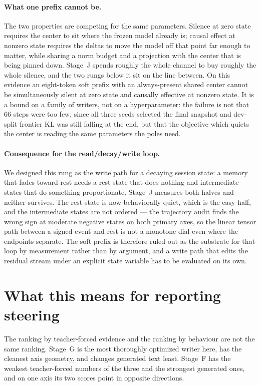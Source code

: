 \documentclass[10pt]{article}
\begin{document}
\paragraph{What one prefix cannot be.} The two properties are competing for the
same parameters. Silence at zero state requires the center to sit where the
frozen model already is; causal effect at nonzero state requires the deltas to
move the model off that point far enough to matter, while sharing a norm budget
and a projection with the center that is being pinned down. Stage~J spends
roughly the whole channel to buy roughly the whole silence, and the two rungs
below it sit on the line between. On this evidence an eight-token soft prefix
with an always-present shared center cannot be simultaneously silent at zero
state and causally effective at nonzero state. It is a bound on a family of
writers, not on a hyperparameter: the failure is not that 66 steps were too few,
since all three seeds selected the final snapshot and dev-split frontier KL was
still falling at the end, but that the objective which quiets the center is
reading the same parameters the poles need.

\paragraph{Consequence for the read/decay/write loop.} We designed this rung as
the write path for a decaying session state: a memory that fades toward rest
needs a rest state that does nothing and intermediate states that do something
proportionate. Stage~J measures both halves and neither survives. The rest state
is now behaviorally quiet, which is the easy half, and the intermediate states
are not ordered --- the trajectory audit finds the wrong sign at moderate
negative states on both primary axes, so the linear tensor path between a signed
event and rest is not a monotone dial even where the endpoints separate. The
soft prefix is therefore ruled out as the substrate for that loop by
measurement rather than by argument, and a write path that edits the residual
stream under an explicit state variable has to be evaluated on its own.

\section{What this means for reporting steering}

The ranking by teacher-forced evidence and the ranking by behaviour are not the
same ranking. Stage~G is the most thoroughly optimized writer here, has the
cleanest axis geometry, and changes generated text least. Stage~F has the
weakest teacher-forced numbers of the three and the strongest generated ones,
and on one axis its two scores point in opposite directions.
\end{document}
